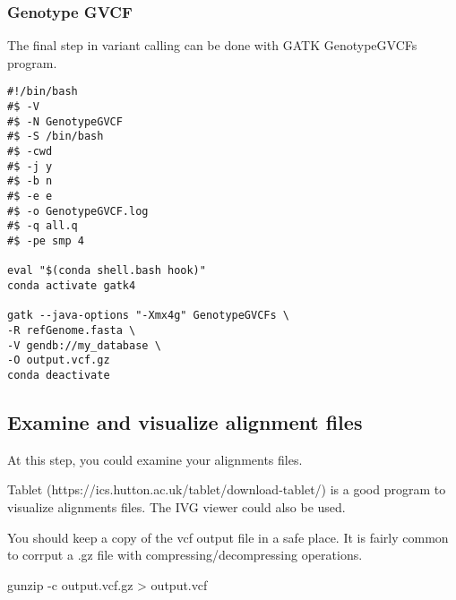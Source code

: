 \subsubsection{Genotype GVCF}

The final step in variant calling can be done with GATK GenotypeGVCFs program.

\begin{verbatim}
#!/bin/bash
#$ -V
#$ -N GenotypeGVCF
#$ -S /bin/bash
#$ -cwd
#$ -j y
#$ -b n
#$ -e e
#$ -o GenotypeGVCF.log
#$ -q all.q
#$ -pe smp 4

eval "$(conda shell.bash hook)"
conda activate gatk4

gatk --java-options "-Xmx4g" GenotypeGVCFs \
-R refGenome.fasta \
-V gendb://my_database \
-O output.vcf.gz
conda deactivate
\end{verbatim}






\subsection{Examine and visualize alignment files}

At this step, you could examine your alignments files.

Tablet (https://ics.hutton.ac.uk/tablet/download-tablet/) is a good program to visualize alignments files. The IVG viewer could also be used.


You should keep a copy of the vcf output file in a safe place. It is fairly common to corrput a .gz file with compressing/decompressing operations.





gunzip -c output.vcf.gz > output.vcf
